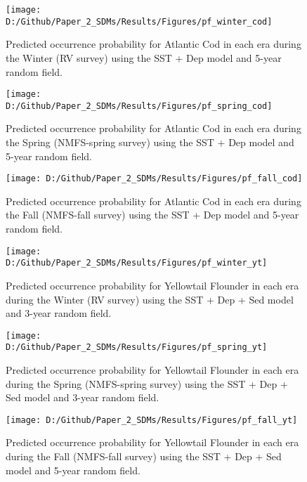 \documentclass[
]{article}
\begin{document}
\newpage
\begin{landscape}
\begin{figure}
\texttt{[image: D:/Github/Paper\_2\_SDMs/Results/Figures/pf\_winter\_cod]} \caption{Predicted occurrence probability for Atlantic Cod  in each era during the Winter (RV survey) using the SST + Dep model and 5-year random field.}\label{fig:pf-winter-cod}
\end{figure}

\newpage
\begin{figure}
\texttt{[image: D:/Github/Paper\_2\_SDMs/Results/Figures/pf\_spring\_cod]} \caption{Predicted occurrence probability for Atlantic Cod  in each era during the Spring (NMFS-spring survey) using the SST + Dep model and 5-year random field.}\label{fig:pf-spring-cod}
\end{figure}

\newpage
\begin{figure}
\texttt{[image: D:/Github/Paper\_2\_SDMs/Results/Figures/pf\_fall\_cod]} \caption{Predicted occurrence probability for Atlantic Cod  in each era during the Fall (NMFS-fall survey) using the SST + Dep model and 5-year random field.}\label{fig:pf-fall-cod}
\end{figure}

\newpage
\begin{figure}
\texttt{[image: D:/Github/Paper\_2\_SDMs/Results/Figures/pf\_winter\_yt]} \caption{Predicted occurrence probability for Yellowtail Flounder in each era during the Winter (RV survey) using the SST + Dep + Sed model and 3-year random field.}\label{fig:pf-winter-yt}
\end{figure}

\newpage
\begin{figure}
\texttt{[image: D:/Github/Paper\_2\_SDMs/Results/Figures/pf\_spring\_yt]} \caption{Predicted occurrence probability for Yellowtail Flounder in each era during the Spring (NMFS-spring survey) using the SST + Dep + Sed  model and 3-year random field.}\label{fig:pf-spring-yt}
\end{figure}

\newpage
\begin{figure}
\texttt{[image: D:/Github/Paper\_2\_SDMs/Results/Figures/pf\_fall\_yt]} \caption{Predicted occurrence probability for Yellowtail Flounder in each era during the Fall (NMFS-fall survey) using the SST + Dep + Sed model and 5-year random field.}\label{fig:pf-fall-yt}
\end{figure}


\end{landscape}
\end{document}

